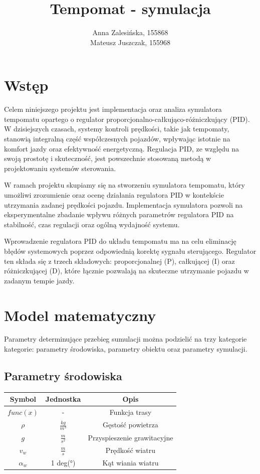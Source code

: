 \documentclass[12pt,a4paper]{article}
\begin{document}
	\title{Tempomat - symulacja}
	\author{Anna Zalesińska, 155868 \\ Mateusz Juszczak, 155968}
	\date{}
	\maketitle
	\section{Wstęp}
	Celem niniejszego projektu jest implementacja oraz analiza symulatora tempomatu opartego o regulator proporcjonalno-całkująco-różniczkujący (PID). W dzisiejszych czasach, systemy kontroli prędkości, takie jak tempomaty, stanowią integralną część współczesnych pojazdów, wpływając istotnie na komfort jazdy oraz efektywność energetyczną. Regulacja PID, ze względu na swoją prostotę i skuteczność, jest powszechnie stosowaną metodą w projektowaniu systemów sterowania.
	
	W ramach projektu skupiamy się na stworzeniu symulatora tempomatu, który umożliwi zrozumienie oraz ocenę działania regulatora PID w kontekście utrzymania zadanej prędkości pojazdu. Implementacja symulatora pozwoli na eksperymentalne zbadanie wpływu różnych parametrów regulatora PID na stabilność, czas regulacji oraz ogólną wydajność systemu.
	
	Wprowadzenie regulatora PID do układu tempomatu ma na celu eliminację błędów systemowych poprzez odpowiednią korektę sygnału sterującego. Regulator ten składa się z trzech składowych: proporcjonalnej (P), całkującej (I) oraz różniczkującej (D), które łącznie pozwalają na skuteczne utrzymanie pojazdu w zadanym tempie jazdy.
	
	\section{Model matematyczny}
	Parametry determinujące przebieg sumulacji można podzielić na trzy kategorie kategorie: parametry środowiska, parametry obiektu oraz parametry symulacji.
	
	\subsection{Parametry środowiska}
		\begin{center}
			\begin{tabular}{|c|c|c|}
				\hline
				Symbol & Jednostka & Opis \\
				\hline
				\hline
				$func(x)$ & - & Funkcja trasy \\
				\hline
				$\rho$ & $\frac{kg}{m^3}$ & Gęstość powietrza \\
				\hline
				$g$ & $\frac{m}{s^2}$ & Przyspieszenie grawitacyjne\\
				\hline
				$v_w$ & $\frac{m}{s}$ & Prędkość wiatru \\
				\hline
				$\alpha_w$ & 1 deg(°) & Kąt wiania wiatru \\
				\hline
			\end{tabular}
		\end{center}
	
\end{document}
